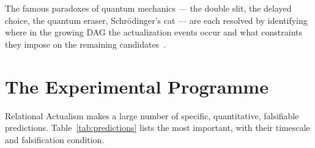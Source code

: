 \documentclass[11pt,a4paper]{article}
\begin{document}
The famous paradoxes of quantum mechanics --- the double slit, the
delayed choice, the quantum eraser, Schr\"{o}dinger's cat --- are each
resolved by identifying where in the growing DAG the actualization
events occur and what constraints they impose on the remaining
candidates~\citep{Sandeman2026RAQM}.

\section{The Experimental Programme}
\label{sec:experiment}

Relational Actualism makes a large number of specific, quantitative,
falsifiable predictions. Table~\ref{tab:predictions} lists the most
important, with their timescale and falsification condition.
\end{document}

